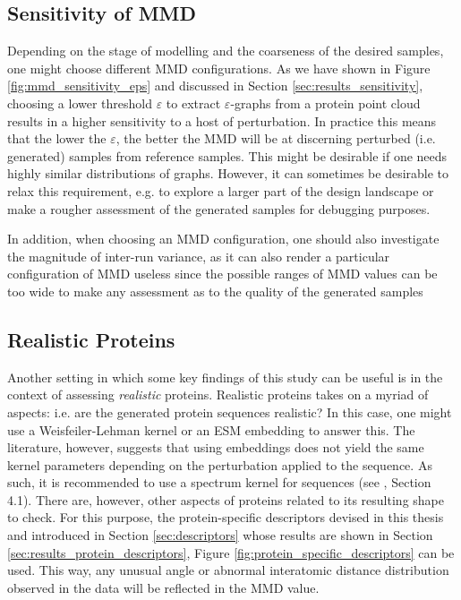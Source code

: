 \subsection{Sensitivity of MMD}\label{sec:discussion_right_mmd}
Depending on the stage of modelling and the coarseness of the desired samples,
one might choose different MMD configurations. As we have shown in Figure
\ref{fig:mmd_sensitivity_eps} and discussed in Section
\ref{sec:results_sensitivity}, choosing a lower threshold $\varepsilon$ to
extract $\varepsilon$-graphs from a protein point cloud results in a higher
sensitivity to a host of perturbation. In practice this means that the lower the
$\varepsilon$, the better the MMD will be at discerning perturbed (i.e.
generated) samples from reference samples. This might be desirable if one needs
highly similar distributions of graphs. However, it can sometimes be desirable
to relax this requirement, e.g. to explore a larger part of the design landscape
or make a rougher assessment of the generated samples for debugging purposes.

In addition, when choosing an MMD configuration, one should also investigate the
magnitude of inter-run variance, as it can also render a particular
configuration of MMD useless since the possible ranges of MMD values can be too
wide to make any assessment as to the quality of the generated samples

\subsection{Realistic Proteins}\label{sec:discussion_realistic_proteins}

Another setting in which some key findings of this study can be useful is in the
context of assessing \emph{realistic} proteins. Realistic proteins takes on a
myriad of aspects: i.e. are the generated protein sequences realistic? In this
case, one might use a Weisfeiler-Lehman kernel or an ESM embedding to answer
this. The literature, however, suggests that using embeddings does not yield the
same kernel parameters depending on the perturbation applied to the sequence. As
such, it is recommended to use a spectrum kernel \citep{leslie2001spectrum} for
sequences (see \cite{kucera2021conditional}, Section 4.1). There are, however,
other aspects of proteins related to its resulting shape to check. For this
purpose, the protein-specific descriptors devised in this thesis and introduced in
Section \ref{sec:descriptors} whose results are shown in Section
\ref{sec:results_protein_descriptors}, Figure
\ref{fig:protein_specific_descriptors} can be used. This way, any unusual angle
or abnormal interatomic distance distribution observed in the data will be
reflected in the MMD value.

